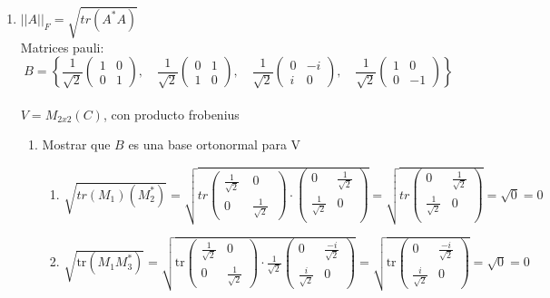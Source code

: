 \documentclass{report}
\begin{document}
\begin{enumerate}
    \item $||A||_F=\sqrt{tr(A^*A)}$\\
    
        Matrices pauli: $$B=\left\{
      \frac{1}{\sqrt{2}}\begin{pmatrix}
    1 & 0\\
    0 & 1
    \end{pmatrix}, \quad
    \frac{1}{\sqrt{2}}\begin{pmatrix}
    0 & 1 \\
    1 & 0
    \end{pmatrix}, \quad
    \frac{1}{\sqrt{2}} \begin{pmatrix}
    0 & -i \\
    i & 0
    \end{pmatrix}, \quad
    \frac{1}{\sqrt{2}} \begin{pmatrix}
    1 & 0 \\
    0 & -1
    \end{pmatrix}\right\}
    $$    
    \\$V=M_{2x2}(C)$, con producto frobenius
    
    
    
    \begin{enumerate}[label=\alph*)]
        \item Mostrar que $B$ es una base ortonormal para V
                \begin{enumerate}
                    \item  $\sqrt{tr(M_1)(M_2^*)}=\sqrt{tr\begin{pmatrix}
    \frac{1}{\sqrt{2}}\ & 0\\
    0 & \frac{1}{\sqrt{2}}\
    \end{pmatrix} \cdot \begin{pmatrix}
    0 & \frac{1}{\sqrt{2}}\\
    \frac{1}{\sqrt{2}} & 0\\
    \end{pmatrix}}=\sqrt{tr\begin{pmatrix}
    0 & \frac{1}{\sqrt{2}}\\
    \frac{1}{\sqrt{2}} & 0\\
    \end{pmatrix}}=\sqrt{0}=0 $
    
    
    
    
     
    \item $\sqrt{\text{tr}(M_1 M_3^*)} = \sqrt{\text{tr} \begin{pmatrix}
    \frac{1}{\sqrt{2}} & 0\\
    0 & \frac{1}{\sqrt{2}}
    \end{pmatrix} \cdot \frac{1}{\sqrt{2}}\begin{pmatrix}
    0 & \frac{-i}{\sqrt{2}}\\
    \frac{i}{\sqrt{2}} & 0
    \end{pmatrix}  }= \sqrt{\text{tr}  \begin{pmatrix}
    0 & \frac{-i}{\sqrt{2}}\\
    \frac{i}{\sqrt{2}} & 0
    \end{pmatrix} } = \sqrt{0} = 0 $
    

\end{enumerate}
\end{enumerate}
\end{enumerate}
\end{document}
